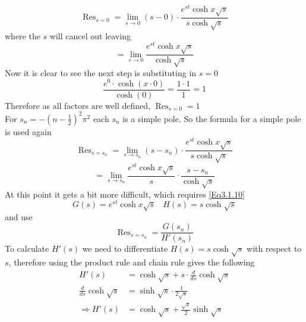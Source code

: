 $$\operatorname{Res}_{s=0}=\lim_{s\to0}(s-0)\cdot\frac{e^{st}\cosh x\sqrt{s}}{s\cosh\sqrt{s}}$$ where the $s$ will cancel out leaving $$=\lim_{s\to0}\frac{e^{st}\cosh x\sqrt{s}}{\cosh\sqrt{s}}$$ Now it is clear to see the next step is substituting in $s=0$ $$\frac{e^0\cdot\cosh(x\cdot0)}{\cosh(0)}=\frac{1\cdot1}{1}=1$$ Therefore as all factors are well defined, $\operatorname{Res}_{s=0}=1$ \\ For $s_n=-\left(n-\frac{1}{2}\right)^2\pi^2$ each $s_n$ is a simple pole. So the formula for a simple pole is used again $$\operatorname{Res}_{s=s_n}=\lim_{s\to s_n}(s-s_n)\cdot\frac{e^{st}\cosh x\sqrt{s}}{s\cosh\sqrt{s}}$$ $$=\lim_{s\to s_n}\frac{e^{st}\cosh x\sqrt{s}}{s}\cdot\frac{s-s_n}{\cosh\sqrt{s}}$$ At this point it gets a bit more difficult, which requires \ref{Eq3.1.10}
$$G(s)=e^{st}\cosh x\sqrt{s} \ \ \ \ H(s)=s\cosh\sqrt{s}$$ and use $$\operatorname{Res}_{s=s_n}=\frac{G(s_n)}{H'(s_n)}$$ To calculate $H'(s)$ we need to differentiate $H(s)=s\cosh \sqrt{s}$ with respect to $s$, therefore using the product rule and chain rule gives the following 
\begin{align*}
    H'(s)&=\cosh\sqrt{s}+s\cdot\frac{d}{ds}\cosh\sqrt{s} \\
    \frac{d}{ds}\cosh\sqrt{s}&=\sinh\sqrt{s}\cdot\frac{1}{2\sqrt{s}} \\
    \Rightarrow H'(s)&=\cosh\sqrt{s}+\frac{\sqrt{s}}{2}\sinh\sqrt{s}
\end{align*}
